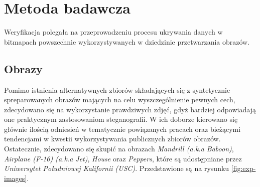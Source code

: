 {    %
    \section{Metoda badawcza}
    {
        Weryfikacja polegała na przeprowadzeniu procesu ukrywania danych w bitmapach powszechnie wykorzystywanych w
        dziedzinie przetwarzania obrazów.

        \subsection{Obrazy}
        {
            Pomimo istnienia alternatywnych zbiorów składających się z syntetycznie spreparowanych obrazów mających na
            celu wyszczególnienie pewnych cech\cite{Uhlmann2018ACI}, zdecydowano się na wykorzystanie prawdziwych zdjęć,
            gdyż bardziej odpowiadają one praktycznym zastosowaniom steganografii. W ich doborze kierowano się głównie
            ilością odniesień w tematycznie powiązanych pracach oraz bieżącymi tendencjami w kwestii wykorzystywania
            publicznych zbiorów obrazów\cite{NoteOnLena1, NoteOnLena2}. Ostatecznie, zdecydowano się skupić na obrazach
            \textit{Mandrill (a.k.a Baboon)}, \textit{Airplane (F-16) (a.k.a Jet)}, \textit{House} oraz
            \textit{Peppers}, które są udostępniane przez \textit{Uniwersytet Południowej Kalifornii
            (USC)}\cite{USCDatabase}. Przedstawione są na rysunku \ref{fig:exp-images}.

            \begin{figure}
                \footnotesize
                \centering
                \hspace{8pt}
                 \\
                \hspace{8pt}


\end{figure}}}}
